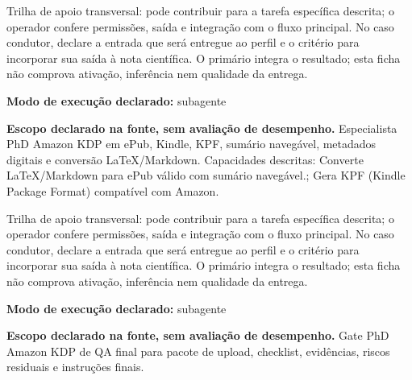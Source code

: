 \begin{funcao}
Trilha de apoio transversal: pode contribuir para a tarefa específica descrita; o operador confere permissões, saída e integração com o fluxo principal. No caso condutor, declare a entrada que será entregue ao perfil e o critério para incorporar sua saída à nota científica. O primário integra o resultado; esta ficha não comprova ativação, inferência nem qualidade da entrega.
\end{funcao}

\begin{arquitetura}
\textbf{Modo de execução declarado:} subagente
\end{arquitetura}


\begin{descricao}
\textbf{Escopo declarado na fonte, sem avaliação de desempenho.}
Especialista PhD Amazon KDP em ePub, Kindle, KPF, sumário navegável, metadados digitais e conversão LaTeX/Markdown. Capacidades descritas: Converte LaTeX/Markdown para ePub válido com sumário navegável.; Gera KPF (Kindle Package Format) compatível com Amazon.
\end{descricao}

\begin{funcao}
Trilha de apoio transversal: pode contribuir para a tarefa específica descrita; o operador confere permissões, saída e integração com o fluxo principal. No caso condutor, declare a entrada que será entregue ao perfil e o critério para incorporar sua saída à nota científica. O primário integra o resultado; esta ficha não comprova ativação, inferência nem qualidade da entrega.
\end{funcao}

\begin{arquitetura}
\textbf{Modo de execução declarado:} subagente
\end{arquitetura}


\begin{descricao}
\textbf{Escopo declarado na fonte, sem avaliação de desempenho.}
Gate PhD Amazon KDP de QA final para pacote de upload, checklist, evidências, riscos residuais e instruções finais.
\end{descricao}

